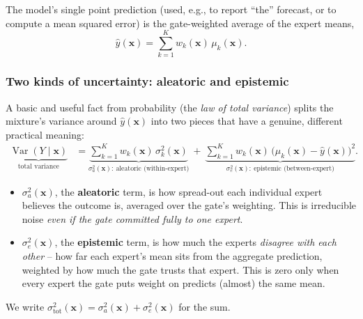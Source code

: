 \documentclass[11pt]{article}
\begin{document}
The model's single point prediction (used, e.g., to report ``the'' forecast, or to compute a mean
squared error) is the gate-weighted average of the expert means,
\begin{equation}
\hat y(\bm x) = \sum_{k=1}^K w_k(\bm x)\, \mu_k(\bm x).
\label{eq:yhatdef}
\end{equation}

\subsubsection{Two kinds of uncertainty: aleatoric and epistemic}
\label{sec:aleaepis}

A basic and useful fact from probability (the \emph{law of total variance}) splits the mixture's
variance around $\hat y(\bm x)$ into two pieces that have a genuine, different practical meaning:
\begin{align}
\underbrace{\operatorname{Var}(Y\mid\bm x)}_{\text{total variance}}
&= \underbrace{\sum_{k=1}^K w_k(\bm x)\,\sigma_k^2(\bm x)}_{\sigma_a^2(\bm x):\ \text{aleatoric (within-expert)}}
\ +\ \underbrace{\sum_{k=1}^K w_k(\bm x)\,\big(\mu_k(\bm x) - \hat y(\bm x)\big)^2}_{\sigma_e^2(\bm x):\ \text{epistemic (between-expert)}}.
\label{eq:lotv}
\end{align}
\begin{itemize}[leftmargin=1.5em]
\item $\sigma_a^2(\bm x)$, the \textbf{aleatoric} term, is how spread-out each individual expert
believes the outcome is, averaged over the gate's weighting. This is irreducible noise \emph{even
if the gate committed fully to one expert}.
\item $\sigma_e^2(\bm x)$, the \textbf{epistemic} term, is how much the experts \emph{disagree
with each other} -- how far each expert's mean sits from the aggregate prediction, weighted by how
much the gate trusts that expert. This is zero only when every expert the gate puts weight on
predicts (almost) the same mean.
\end{itemize}
We write $\sigma_{\mathrm{tot}}^2(\bm x) = \sigma_a^2(\bm x) + \sigma_e^2(\bm x)$ for the sum.
\end{document}
